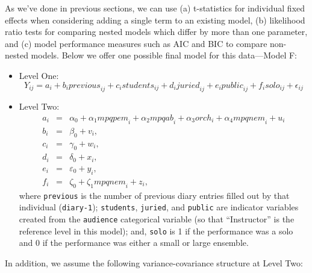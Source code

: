 \documentclass[
]{krantz}
\providecommand{\tightlist}{%
  \setlength{\itemsep}{0pt}\setlength{\parskip}{0pt}}
\begin{document}
As we've done in previous sections, we can use (a) t-statistics for individual fixed effects when considering adding a single term to an existing model, (b) likelihood ratio tests for comparing nested models which differ by more than one parameter, and (c) model performance measures such as AIC and BIC to compare non-nested models. Below we offer one possible final model for this data---Model F:

\begin{itemize}
\tightlist
\item
  Level One:
  \begin{equation}
  Y_{ij} = a_{i}+b_{i}\textstyle{previous}_{ij}+c_{i}\textstyle{students}_{ij}+
  d_{i}\textstyle{juried}_{ij}+e_{i}\textstyle{public}_{ij}+f_{i}\textstyle{solo}_{ij}+\epsilon_{ij}
  \label{eq:level1modelf}
  \end{equation}
\item
  Level Two:
  \begin{eqnarray*}
  a_{i} & = & \alpha_{0}+\alpha_{1}\textstyle{mpqpem}_{i}+\alpha_{2}\textstyle{mpqab}_{i} + \alpha_{3}\textstyle{orch}_{i}+\alpha_{4}\textstyle{mpqnem}_{i}+u_{i} \\
  b_{i} & = & \beta_{0}+v_{i}, \\
  c_{i} & = & \gamma_{0}+w_{i}, \\
  d_{i} & = & \delta_{0}+x_{i}, \\
  e_{i} & = & \varepsilon_{0}+y_{i}, \\
  f_{i} & = & \zeta_{0}+\zeta_{1}\textstyle{mpqnem}_{i}+z_{i},
  \end{eqnarray*}
  where \texttt{previous} is the number of previous diary entries filled out by that individual (\texttt{diary-1}); \texttt{students}, \texttt{juried}, and \texttt{public} are indicator variables created from the \texttt{audience} categorical variable (so that ``Instructor'' is the reference level in this model); and, \texttt{solo} is 1 if the performance was a solo and 0 if the performance was either a small or large ensemble.
\end{itemize}

In addition, we assume the following variance-covariance structure at Level Two:
\end{document}
